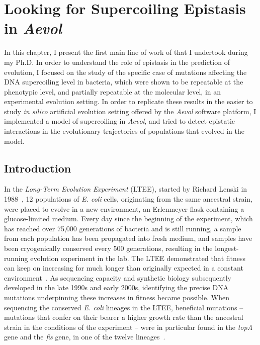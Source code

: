 \chapter{Looking for Supercoiling Epistasis in \emph{Aevol}}
\label{chap:aevol}

In this chapter, I present the first main line of work of that I undertook during my Ph.D.
In order to understand the role of epistasis in the prediction of evolution, I focused on the study of the specific case of mutations affecting the DNA supercoiling level in bacteria, which were shown to be repeatable at the phenotypic level, and partially repeatable at the molecular level, in an experimental evolution setting.
In order to replicate these results in the easier to study \emph{in silico} artificial evolution setting offered by the \emph{Aevol} software platform, I implemented a model of supercoiling in \emph{Aevol}, and tried to detect epistatic interactions in the evolutionary trajectories of populations that evolved in the model.

\section{Introduction}
\label{sec:aevol:intro}

In the \emph{Long-Term Evolution Experiment} (LTEE), started by Richard Lenski in 1988~\citep{lenski1991}, 12 populations of \emph{E. coli} cells, originating from the same ancestral strain, were placed to evolve in a new environment, an Erlenmeyer flask containing a glucose-limited medium.
Every day since the beginning of the experiment, which has reached over 75,000 generations of bacteria and is still running, a sample from each population has been propagated into fresh medium, and samples have been cryogenically conserved every 500 generations, resulting in the longest-running evolution experiment in the lab.
The LTEE demonstrated that fitness can keep on increasing for much longer than originally expected in a constant environment~\citep{good2017}.
As sequencing capacity and synthetic biology subsequently developed in the late 1990s and early 2000s, identifying the precise DNA mutations underpinning these increases in fitness became possible.
When sequencing the conserved \emph{E. coli} lineages in the LTEE, beneficial mutations -- mutations that confer on their bearer a higher growth rate than the ancestral strain in the conditions of the experiment -- were in particular found in the \emph{topA} gene and the \emph{fis} gene, in one of the twelve lineages~\citep{crozat2005}.

